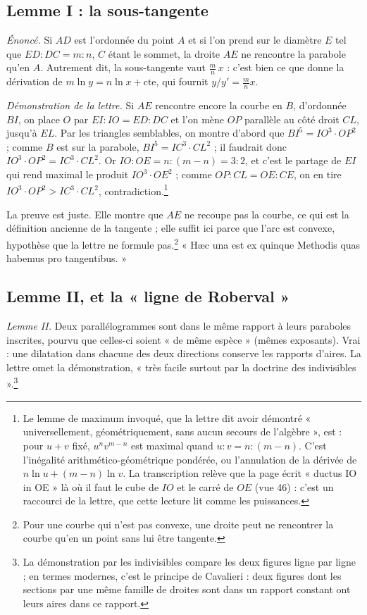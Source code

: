 \documentclass[11pt,a4paper]{article}
\begin{document}
\subsection*{Lemme I : la sous-tangente}

\emph{Énoncé.} Si $AD$ est l'ordonnée du point $A$ et si l'on prend sur le
diamètre $E$ tel que $ED : DC = m : n$, $C$ étant le sommet, la droite $AE$ ne
rencontre la parabole qu'en $A$. Autrement dit, la sous-tangente vaut
$\frac{m}{n}\,x$ : c'est bien ce que donne la dérivation de $m\ln y = n\ln x +
\text{cte}$, qui fournit $y/y' = \frac{m}{n}x$.

\emph{Démonstration de la lettre.} Si $AE$ rencontre encore la courbe en $B$,
d'ordonnée $BI$, on place $O$ par $EI : IO = ED : DC$ et l'on mène $OP$ parallèle
au côté droit $CL$, jusqu'à $EL$. Par les triangles semblables, on montre d'abord
que $BI^5 = IO^3\cdot OP^2$ ; comme $B$ est sur la parabole, $BI^5 = IC^3\cdot
CL^2$ ; il faudrait donc $IO^3\cdot OP^2 = IC^3\cdot CL^2$. Or $IO : OE = n :
(m-n) = 3:2$, et c'est le partage de $EI$ qui rend maximal le produit $IO^3\cdot
OE^2$ ; comme $OP : CL = OE : CE$, on en tire $IO^3\cdot OP^2 > IC^3\cdot CL^2$,
contradiction.\footnote{Le lemme de maximum invoqué, que la lettre dit avoir
démontré « universellement, géométriquement, sans aucun secours de l'algèbre »,
est : pour $u+v$ fixé, $u^nv^{m-n}$ est maximal quand $u:v = n:(m-n)$. C'est
l'inégalité arithmético-géométrique pondérée, ou l'annulation de la dérivée de
$n\ln u+(m-n)\ln v$. La transcription relève que la page écrit « ductus IO in OE »
là où il faut le cube de $IO$ et le carré de $OE$ (vue 46) : c'est un raccourci
de la lettre, que cette lecture lit comme les puissances.}

La preuve est juste. Elle montre que $AE$ ne recoupe pas la courbe, ce qui est la
définition ancienne de la tangente ; elle suffit ici parce que l'arc est
convexe, hypothèse que la lettre ne formule pas.\footnote{Pour une courbe qui
n'est pas convexe, une droite peut ne rencontrer la courbe qu'en un point sans
lui être tangente.} « Hæc una est ex quinque Methodis quas habemus pro
tangentibus. »

\subsection*{Lemme II, et la « ligne de Roberval »}

\emph{Lemme II.} Deux parallélogrammes sont dans le même rapport à leurs
paraboles inscrites, pourvu que celles-ci soient « de même espèce » (mêmes
exposants). Vrai : une dilatation dans chacune des deux directions conserve les
rapports d'aires. La lettre omet la démonstration, « très facile surtout par la
doctrine des indivisibles ».\footnote{La démonstration par les indivisibles
compare les deux figures ligne par ligne ; en termes modernes, c'est le principe
de Cavalieri : deux figures dont les sections par une même famille de droites
sont dans un rapport constant ont leurs aires dans ce rapport.}
\end{document}
